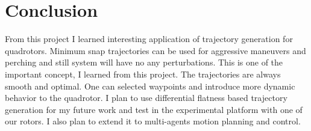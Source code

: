 \documentclass[conference,onecolumn,10pt]{IEEEtran}
\begin{document}


\section{Conclusion}
From this project I learned interesting application of trajectory generation for quadrotors. Minimum snap trajectories can be used for aggressive maneuvers and perching and still system will have no any perturbations. This is one of the important concept, I learned from this project. The trajectories are always smooth and optimal. One can selected waypoints and introduce more dynamic behavior to the quadrotor. I plan to use differential flatness based trajectory generation for my future work and test in the experimental platform with one of our rotors. I also plan to extend it to multi-agents motion planning and control. 


%
%
%
%
%







\end{document}
